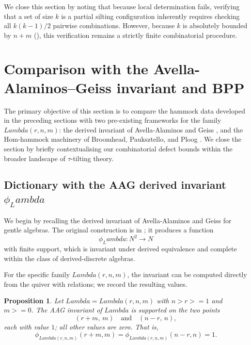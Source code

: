 \documentclass[11pt, a4paper]{article}
\newtheorem{proposition}[theorem]{Proposition}
\theoremstyle{definition}
\def\Lambda{Lambda}%
\def\ss{ss}%
\def\ge{>=}%
\def\mathbb#1{#1}%
\begin{document}
We close this section by noting that because local determination fails, verifying that a set of size $k$ is a partial silting configuration inherently requires checking all $k(k-1)/2$ pairwise combinations. However, because $k$ is absolutely bounded by $n+m$ (), this verification remains a strictly finite combinatorial procedure.



\section{Comparison with the Avella-Alaminos--Gei\texorpdfstring{\ss}{ss} invariant and BPP}\label{sec:AAG}

The primary objective of this section is to compare the hammock data developed in the preceding sections with two pre-existing frameworks for the family $\Lambda(r,n,m)$: the derived invariant of Avella-Alaminos and Gei\ss{} \cite{AAG2008}, and the Hom-hammock machinery of Broomhead, Pauksztello, and Ploog \cite{BPP2017}. We close the section by briefly contextualising our combinatorial defect bounds within the broader landscape of $\tau$-tilting theory.

\subsection{Dictionary with the AAG derived invariant \texorpdfstring{$\phi_\Lambda$}{phi-Lambda}}\label{subsec:AAG-invariant}

We begin by recalling the derived invariant of Avella-Alaminos and Gei\ss{} for gentle algebras. The original construction is in \cite{AAG2008}; it produces a function
\[
  \phi_\Lambda \colon \mathbb N^2 \to \mathbb N
\]
with finite support, which is invariant under derived equivalence and complete within the class of derived-discrete algebras.

For the specific family $\Lambda(r,n,m)$, the invariant can be computed directly from the quiver with relations; we record the resulting values.

\begin{proposition}\label{prop:AAG-explicit}
Let $\Lambda=\Lambda(r,n,m)$ with $n>r\ge 1$ and $m\ge 0$. The AAG invariant of $\Lambda$ is supported on the two points
\[
  (r+m,\,m) \quad\text{and}\quad (n-r,\,n),
\]
each with value $1$; all other values are zero. That is,
\[
  \phi_{\Lambda(r,n,m)}(r+m,m)=\phi_{\Lambda(r,n,m)}(n-r,n)=1.
\]
\end{proposition}
\end{document}
